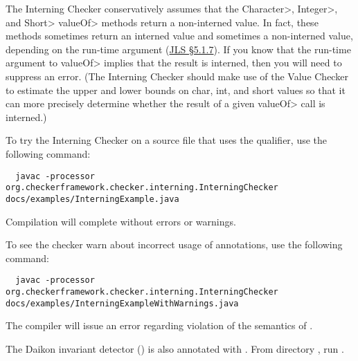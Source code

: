
The Interning Checker conservatively assumes that the \<Character>, \<Integer>,
and \<Short> \<valueOf> methods return a non-interned value.  In fact, these
methods sometimes return an interned value and sometimes a non-interned
value, depending on the run-time argument (\href{https://docs.oracle.com/javase/specs/jls/se11/html/jls-5.html#jls-5.1.7}{JLS
\S5.1.7}).  If you know that the run-time argument to \<valueOf> implies that
the result is interned, then you will need to suppress an error.
(The Interning Checker should make use of the Value Checker to estimate the upper
and lower bounds on char, int, and short values so that it can more
precisely determine whether the result of a given \<valueOf> call is
interned.)




To try the Interning Checker on a source file that uses the  qualifier,
use the following command:

\begin{mysmall}
\begin{Verbatim}
  javac -processor org.checkerframework.checker.interning.InterningChecker docs/examples/InterningExample.java
\end{Verbatim}
\end{mysmall}

\noindent
Compilation will complete without errors or warnings.

To see the checker warn about incorrect usage of annotations, use the following
command:

\begin{mysmall}
\begin{Verbatim}
  javac -processor org.checkerframework.checker.interning.InterningChecker docs/examples/InterningExampleWithWarnings.java
\end{Verbatim}
\end{mysmall}

\noindent
The compiler will issue an error regarding violation of the semantics of
.


The Daikon invariant detector
() is also annotated with
.  From directory ,
run .



